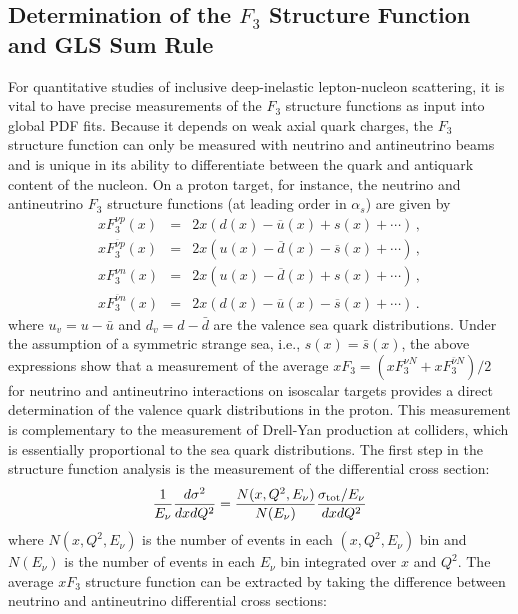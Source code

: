 \subsection{\boldmath Determination of the $F_3$
Structure Function and GLS Sum Rule}
For quantitative studies of inclusive deep-inelastic lepton-nucleon
scattering, it is vital to have precise measurements of the $F_3$
structure functions as input into global PDF fits.  Because it depends
on weak axial quark charges, the $F_3$ structure function can only be
measured with neutrino and antineutrino beams and is unique in its
ability to differentiate between the quark and antiquark content of
the nucleon.  On a proton target, for instance, the neutrino and
antineutrino $F_3$ structure functions (at leading order in
$\alpha_s$) are given by
%
\begin{eqnarray}
xF_3^{\nu p}(x) 
&=& 2 x \left( d(x) - \overline u(x) + s(x) + \cdots \right)\, , \\
%
xF_3^{\overline\nu p}(x) 
&=& 2 x \left( u(x) - \overline d(x) - \overline s(x) + \cdots \right)\, , \\ 
xF_3^{\nu n}(x) 
&=& 2 x \left( u(x) - \overline d(x) + s(x) + \cdots \right)\, , \\
%
xF_3^{\overline\nu n}(x) 
&=& 2 x \left( d(x) - \overline u(x) - \overline s(x) + \cdots \right)\, .
\end{eqnarray}
where $u_v=u-\bar u$ and $d_v=d-\bar d$ are the valence sea quark
distributions. Under the assumption of a symmetric strange sea,
i.e., $s(x)=\bar s(x)$, the above expressions show that a measurement
of the average $xF_3=(xF_3^{\nu N}+xF_3^{\bar\nu N})/2$ for neutrino
and antineutrino interactions on isoscalar targets provides a direct
determination of the valence quark distributions in the proton. This
measurement is complementary to the measurement of Drell-Yan
production at colliders, which is essentially proportional to the sea
quark distributions.
\clearpage
The first step in the structure function analysis is the measurement
of the differential cross section:
\begin{equation} 
\frac{1}{E_\nu} \frac{d \sigma^2}{dx dQ^2} = \frac{N(x,Q^2,E_\nu)}{N(E_\nu)} \frac{\sigma_{\rm tot}/E_\nu}{dx dQ^2} 
\end{equation} 
where $N(x,Q^2,E_\nu)$ is the number of events in each $(x,Q^2,E_\nu)$ bin and $N(E_\nu)$ is the number of events in each $E_\nu$ 
bin integrated over $x$ and $Q^2$. The average $xF_3$ structure function can be extracted by taking the difference between neutrino and 
antineutrino differential cross sections: 
